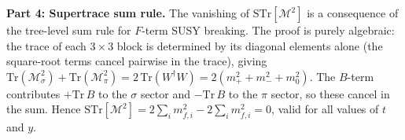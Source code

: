 \bigskip
\textbf{Part 4: Supertrace sum rule.}
The vanishing of $\mathrm{STr}[\mathcal{M}^2]$ is a consequence of the
tree-level sum rule for $F$-term SUSY breaking. The proof is purely algebraic:
the trace of each $3\times 3$ block is determined by its diagonal elements alone
(the square-root terms cancel pairwise in the trace), giving
$\mathrm{Tr}(\mathcal{M}^2_\sigma) + \mathrm{Tr}(\mathcal{M}^2_\pi)
= 2\,\mathrm{Tr}(W^\dagger W) = 2(m_+^2 + m_-^2 + m_0^2)$.
The $B$-term contributes $+\mathrm{Tr}\,B$ to the $\sigma$ sector and
$-\mathrm{Tr}\,B$ to the $\pi$ sector, so these cancel in the sum.
Hence $\mathrm{STr}[\mathcal{M}^2] = 2\sum_i m^2_{f,i} - 2\sum_i m^2_{f,i} = 0$,
valid for all values of $t$ and $y$.

